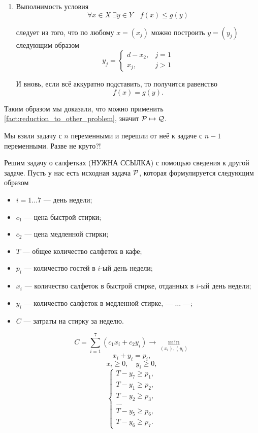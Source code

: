\begin{enumerate}[nosep]
\begin{enumerate}
		\item Выполнимость условия
		\[
		\forall x \in X \; \exists y \in Y \quad f(x) \le g(y)
		\]
		
		следует из того, что по любому $x = (x_j)$ можно построить $y = (y_j)$ следующим образом
		\[
		y_j = \begin{cases}
			d - x_2,& j = 1 \\
			x_j,& j > 1
		\end{cases}
		\]
		
		И вновь, если всё аккуратно подставить, то получится равенство
		\[
		f(x) = g(y).
		\]
	\end{enumerate}
\end{enumerate}

Таким образом мы доказали, что можно применить \cref{fact:reduction_to_other_problem}, значит $\P \mapsto \Q$.

Мы взяли задачу с $n$ переменными и перешли от неё к задаче с $n-1$ переменными. Разве не круто?!


Решим задачу о салфетках (НУЖНА ССЫЛКА) с помощью сведения к другой задаче. Пусть у нас есть исходная задача $\P$, которая формулируется следующим образом

\begin{itemize}[nosep]
	\item $i = 1 \dots 7$ --- день недели;
	
	\item $c_1$ --- цена быстрой стирки;
	
	\item $c_2$ --- цена медленной стирки;
	
	\item $T$ --- общее количество салфеток в кафе;
	
	\item $p_i$ --- количество гостей в $i$-ый день недели;
	
	\item $x_i$ --- количество салфеток в быстрой стирке, отданных в $i$-ый день недели;
	
	\item $y_i$ --- количество салфеток в медленной стирке, --- $\dots$ ---;
	
	\item $C$ --- затраты на стирку за неделю.
\end{itemize}

\[
C = \sum_{i=1}^7 (c_1 x_i + c_2 y_i) \to \min_{(x_i), (y_i)}
\]
\[
x_i + y_i = p_i,
\]
\[
x_i \ge 0, \quad y_i \ge 0,
\]
\[
\begin{cases}
	T - y_7 \ge p_1, \\
	T - y_1 \ge p_2, \\
	T - y_2 \ge p_3, \\
	\dots \\
	T - y_5 \ge p_6, \\
	T - y_6 \ge p_7.
\end{cases}
\]

